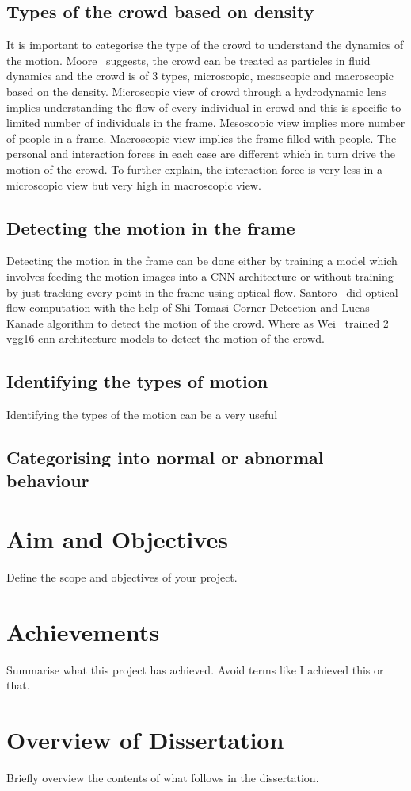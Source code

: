 \subsection{Types of the crowd based on density}
It is important to categorise the type of the crowd to understand the dynamics of the motion. Moore~\cite{moore2011visual} suggests, the crowd can be treated as particles in fluid dynamics and the crowd is of 3 types, microscopic, mesoscopic and macroscopic based on the density. Microscopic view of crowd through a hydrodynamic lens implies understanding the flow of every individual in crowd and this is specific to limited number of individuals in the frame. Mesoscopic view implies more number of people in a frame. Macroscopic view implies the frame filled with people. The personal and interaction forces in each case are different which in turn drive the motion of the crowd. To further explain, the interaction force is very less in a microscopic view but very high in macroscopic view.
\subsection{Detecting the motion in the frame}
Detecting the motion in the frame can be done either by training a model which involves feeding the motion images into a CNN architecture or without training by just tracking every point in the frame using optical flow. Santoro~\cite{santoro2010crowd} did optical flow computation with the help of Shi-Tomasi Corner Detection and Lucas–Kanade algorithm to detect the motion of the crowd. Where as Wei~\cite{wei2020very} trained 2 vgg16 cnn architecture models to detect the motion of the crowd.
\subsection{Identifying the types of motion}
Identifying the types of the motion can be a very useful 
\subsection{Categorising into normal or abnormal behaviour}

\section{Aim and Objectives} \label{sec:objectives}
Define the scope and objectives of your project.

\section{Achievements}
Summarise what this project has achieved. Avoid terms like I achieved this or 
that. 

\section{Overview of Dissertation}
Briefly overview the contents of what follows in the dissertation.